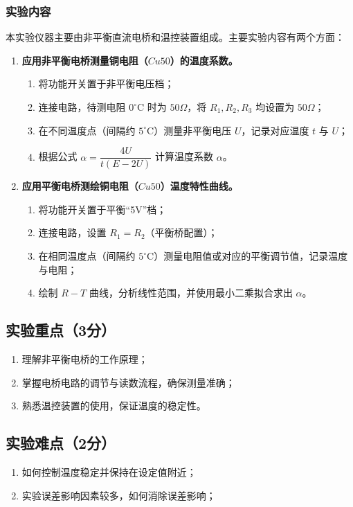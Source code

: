 \documentclass[]{../../templates/Report}%
\begin{document}
\subsubsection{实验内容}
本实验仪器主要由非平衡直流电桥和温控装置组成。主要实验内容有两个方面：

\begin{enumerate}
    \item \textbf{应用非平衡电桥测量铜电阻（$Cu50$）的温度系数。}
    \begin{enumerate}[label=\roman*.]
        \item 将功能开关置于非平衡电压档；
        \item 连接电路，待测电阻 $0^{\circ}\mathrm{C}$ 时为 $50\Omega$，将 $R_1,R_2,R_3$ 均设置为 $50\Omega$；
        \item 在不同温度点（间隔约 $5^{\circ}\mathrm{C}$）测量非平衡电压 $U$，记录对应温度 $t$ 与 $U$；
        \item 根据公式 $\alpha=\dfrac{4U}{t(E-2U)}$ 计算温度系数 $\alpha$。
    \end{enumerate}

    \item \textbf{应用平衡电桥测绘铜电阻（$Cu50$）温度特性曲线。}
    \begin{enumerate}[label=\roman*.]
        \item 将功能开关置于平衡“5V”档；
        \item 连接电路，设置 $R_1=R_2$（平衡桥配置）；
        \item 在相同温度点（间隔约 $5^{\circ}\mathrm{C}$）测量电阻值或对应的平衡调节值，记录温度与电阻；
        \item 绘制 $R-T$ 曲线，分析线性范围，并使用最小二乘拟合求出 $\alpha$。
    \end{enumerate}
\end{enumerate}


\subsection{实验重点（3分）}
\begin{enumerate}
    \item 理解非平衡电桥的工作原理；
    \item 掌握电桥电路的调节与读数流程，确保测量准确；
    \item 熟悉温控装置的使用，保证温度的稳定性。
\end{enumerate}

\subsection{实验难点（2分）}
\begin{enumerate}
    \item 如何控制温度稳定并保持在设定值附近；
    \item 实验误差影响因素较多，如何消除误差影响；
\end{enumerate}
\end{document}
